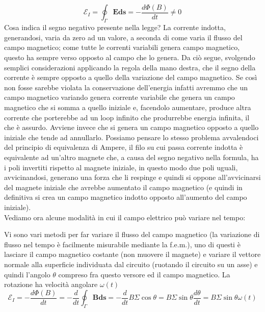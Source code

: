 \documentclass[
10pt, %
a4paper, %
oneside, %
headinclude,footinclude, %
BCOR5mm, %
]{scrartcl}
\begin{document}
\[\mathcal{E}_I = \oint_{\Gamma}\mathbf{E}\mathbf{ds}=-\frac{d\Phi(B)}{dt}\neq 0\]
Cosa indica il segno negativo presente nella legge? La corrente indotta, generandosi, varia da zero ad un valore, a seconda di come varia il flusso del campo magnetico; come tutte le correnti variabili genera campo magnetico, questo ha sempre verso opposto al campo che lo genera. Da ciò segue, svolgendo semplici considerazioni applicando la regola della mano destra, che il segno della corrente è sempre opposto a quello della variazione del campo magnetico.  Se così non fosse sarebbe violata la conservazione dell'energia infatti avremmo che un campo magnetico variando genera corrente variabile che genera un campo magnetico che si somma a quello iniziale e, facendolo aumentare, produce altra corrente che porterebbe ad un loop infinito che produrrebbe energia infinita, il che è assurdo. Avviene invece che si genera un campo magnetico opposto a quello iniziale che tende ad annullarlo. Possiamo pensare lo stesso problema avvalendoci del principio di equivalenza di Ampere, il filo su cui passa corrente indotta è equivalente ad un'altro magnete che, a causa del segno negativo nella formula, ha i poli invertiti rispetto al magnete iniziale, in questo modo due poli uguali, avvicinandosi, generano una forza che li respinge e quindi si oppone all'avvicinarsi del magnete iniziale che avrebbe aumentato il campo magnetico  (e quindi in definitiva si crea un campo magnetico indotto opposto all'aumento del campo iniziale).\\
Vediamo ora alcune modalità in cui il campo elettrico può variare nel tempo:
\begin{esercizio}
Vi sono vari metodi per far variare il flusso del campo magnetico (la variazione di flusso nel tempo è facilmente misurabile mediante la f.e.m.), uno di questi è lasciare il campo magnetico costante (non muovere il magnete) e variare il vettore normale alla superficie individuata dal circuito (ruotando il circuito su un asse) e quindi l'angolo $\theta$ compreso fra questo versore ed il campo magnetico. La rotazione ha velocità angolare $\omega(t)$
\[\mathcal{E}_I = -\frac{d\Phi (B)}{dt} = -\frac{d}{dt}\oint_{\Gamma}\mathbf{B}\mathbf{ds} = -\frac{d}{dt}B\Sigma \cos\theta=B\Sigma \sin\theta\frac{d\theta}{dt}=B\Sigma\sin\theta\omega(t)\]
\end{esercizio}
\end{document}
